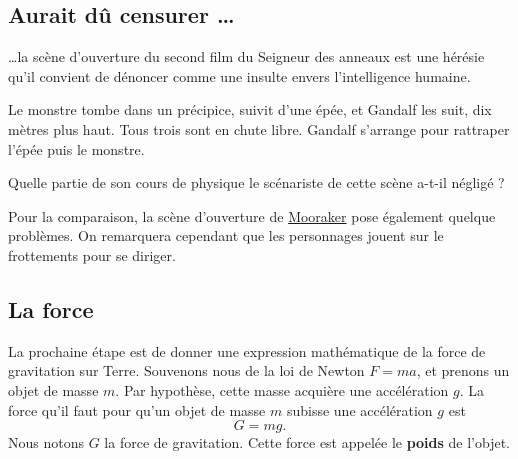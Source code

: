 \documentclass[a4paper,12pt]{book}
\theoremstyle{mes_exemples}	\newtheorem{exemple}[numtho]{Exemple}
\theoremstyle{mes_tho}
\newcommand{\defe}[2]{\textbf{#1}\index{#2}}
\begin{document}
\subsection{Aurait dû censurer \ldots}

\ldots la scène d'ouverture du second film du Seigneur des anneaux est une hérésie qu'il convient de dénoncer comme une insulte envers l'intelligence humaine.

\begin{exercice}
	Le monstre tombe dans un précipice, suivit d'une épée, et Gandalf les suit, dix mètres plus haut. Tous trois sont en chute libre. Gandalf s'arrange pour rattraper l'épée puis le monstre.

	Quelle partie de son cours de physique le scénariste de cette scène a-t-il négligé ?
\end{exercice}

Pour la comparaison, la scène d'ouverture de \href{http://fr.wikipedia.org/wiki/Moonraker_(film)}{Mooraker} pose également quelque problèmes. On remarquera cependant que les personnages jouent sur le frottements pour se diriger.

\subsection{La force}

La prochaine étape est de donner une expression mathématique de la force de gravitation sur Terre. Souvenons nous de la loi de Newton $F=ma$, et prenons un objet de masse $m$. Par hypothèse, cette masse acquière une accélération $g$. La force qu'il faut pour qu'un objet de masse $m$ subisse une accélération $g$ est
\begin{equation}
	G=mg.
\end{equation}
Nous notons $G$ la force de gravitation. Cette force est appelée le \defe{poids}{Poids} de l'objet.

\end{document}
